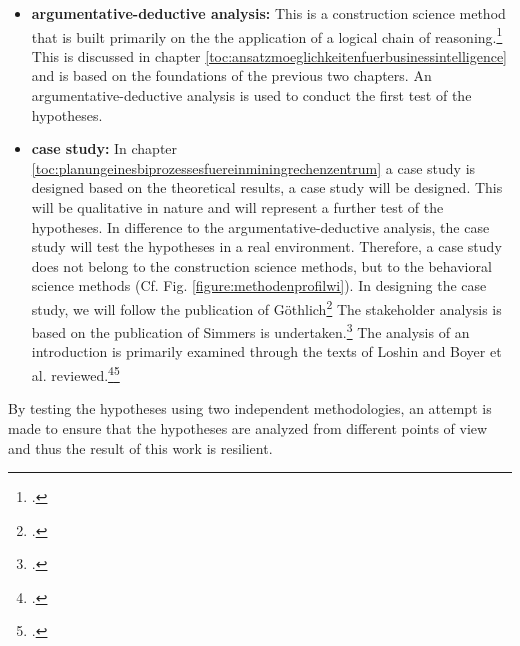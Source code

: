 \begin{itemize}
    \item \textbf{argumentative-deductive analysis: }This is a construction science method that is built primarily on the
    the application of a logical chain of reasoning.\footcite[Cf.][Tbl. 1]{wilde2007forschungsmethoden} This is discussed in chapter
    \ref{toc:ansatzmoeglichkeitenfuerbusinessintelligence} and is based on the foundations of the previous two chapters.
    An argumentative-deductive analysis is used to conduct the first test of the hypotheses. 
    \item \textbf{case study: }In chapter \ref{toc:planungeinesbiprozessesfuereinminingrechenzentrum} a case study is designed based on the theoretical
    results, a case study will be designed. This will be qualitative in nature and will represent a further test of the hypotheses. In
    difference to the argumentative-deductive analysis, the case study will test the hypotheses in a real environment.
    Therefore, a case study does not belong to the construction science methods, but to the behavioral science methods
    (Cf. Fig. \ref{figure:methodenprofilwi}). In designing the case study, we will follow the publication of Göthlich\footcite[Cf.][]{gothlich2003fallstudien}
    The stakeholder analysis is based on the publication of Simmers
    is undertaken.\footcite[Cf.][]{simmers2004stakeholder} The analysis of an introduction is primarily examined through the texts of Loshin and
    Boyer et al. reviewed.\footcite[Cf.][]{loshin2012business}\footcite[Cf.][]{boyer2010business}
\end{itemize} 

By testing the hypotheses using two independent methodologies, an attempt is made to ensure that the hypotheses are analyzed from different points of view
and thus the result of this work is resilient.
